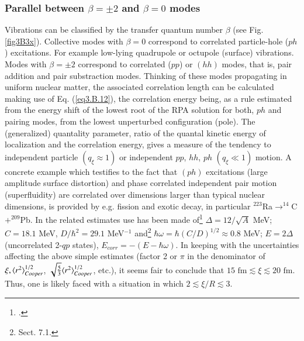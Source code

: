          \subsubsection{Parallel between $\beta=\pm2$ and $\beta=0$ modes}
         Vibrations can be classified by the transfer quantum number $\beta$ (see Fig. \ref{fig3B3x}). Collective modes with $\beta=0$ correspond to correlated particle-hole ($ph$) excitations. For example low-lying quadrupole or octupole (surface)  vibrations. Modes with  $\beta=\pm2$  correspond to correlated ($pp$) or $(hh)$ modes, that is, pair addition and pair substraction modes.
         Thinking of these modes propagating in uniform nuclear matter, the associated correlation length can be calculated making use of Eq. (\ref{eq3.B.12}), the correlation energy being, as a rule estimated from the energy shift of the lowest root of the RPA solution for both, $ph$ and pairing modes, from the lowest unperturbed configuration (pole). The (generalized) quantality parameter, ratio of the quantal kinetic energy of localization and the correlation energy,  gives a measure of the tendency to independent particle $(q_\xi\approx1)$ or independent $pp$, $hh$, $ph$ $(q_\xi\ll1)$ motion. A concrete example which testifies to the fact that $(ph)$ excitations (large amplitude surface distortion) and phase correlated independent pair motion (superfluidity) are correlated over dimensions larger than typical nuclear dimensions, is provided by e.g. fission and exotic decay, in particular $^{223}$Ra$\rightarrow^{14}$C$+^{209}$Pb. In the related estimates use has been made of\footnote{\cite{Bohr:69}.} $\Delta=12/\sqrt{A}$ MeV; $C=18.1$ MeV, $D/\hbar^2=29.1$ MeV$^{-1}$ and\footnote{\cite{Brink:05} Sect. 7.1.} $\hbar\omega=\hbar(C/D)^{1/2}\approx0.8$ MeV; $E=2\Delta$ (uncorrelated 2-$qp$ states), $E_{corr}=-(E-\hbar\omega)$. In keeping with the uncertainties affecting the above simple estimates (factor 2 or $\pi$ in the denominator of $\xi,\langle {r^2} \rangle^{1/2}_{Cooper}$,  $\sqrt{\frac{5}{3}}\langle {r^2} \rangle^{1/2}_{Cooper}$, etc.), it seems fair to conclude that $15\text{ fm}\lesssim\xi\lesssim20\text{ fm}$. Thus, one is likely faced with a  situation in which $2\lesssim\xi/R\lesssim3.$
